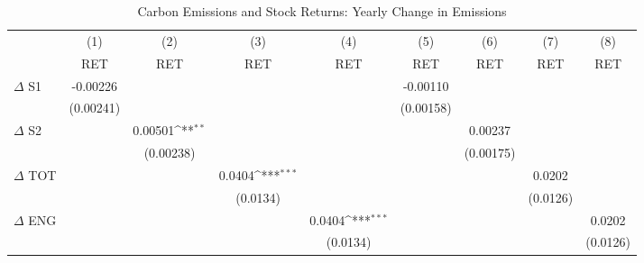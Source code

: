 \begin{table}[htbp]\centering
\def\sym#1{\ifmmode^{#1}\else\(^{#1}\)\fi}
\caption{Carbon Emissions and Stock Returns: Yearly Change in Emissions}
\begin{tabular}{l*{8}{c}}
\hline\hline
                    &\multicolumn{1}{c}{(1)}&\multicolumn{1}{c}{(2)}&\multicolumn{1}{c}{(3)}&\multicolumn{1}{c}{(4)}&\multicolumn{1}{c}{(5)}&\multicolumn{1}{c}{(6)}&\multicolumn{1}{c}{(7)}&\multicolumn{1}{c}{(8)}\\
                    &\multicolumn{1}{c}{RET}&\multicolumn{1}{c}{RET}&\multicolumn{1}{c}{RET}&\multicolumn{1}{c}{RET}&\multicolumn{1}{c}{RET}&\multicolumn{1}{c}{RET}&\multicolumn{1}{c}{RET}&\multicolumn{1}{c}{RET}\\
\hline
$\Delta$ S1         &    -0.00226         &                     &                     &                     &    -0.00110         &                     &                     &                     \\
                    &   (0.00241)         &                     &                     &                     &   (0.00158)         &                     &                     &                     \\
$\Delta$ S2         &                     &     0.00501\sym{**} &                     &                     &                     &     0.00237         &                     &                     \\
                    &                     &   (0.00238)         &                     &                     &                     &   (0.00175)         &                     &                     \\
$\Delta$ TOT        &                     &                     &      0.0404\sym{***}&                     &                     &                     &      0.0202         &                     \\
                    &                     &                     &    (0.0134)         &                     &                     &                     &    (0.0126)         &                     \\
$\Delta$ ENG        &                     &                     &                     &      0.0404\sym{***}&                     &                     &                     &      0.0202         \\
                    &                     &                     &                     &    (0.0134)         &                     &                     &                     &    (0.0126)         \\

\end{tabular}
\end{table}
